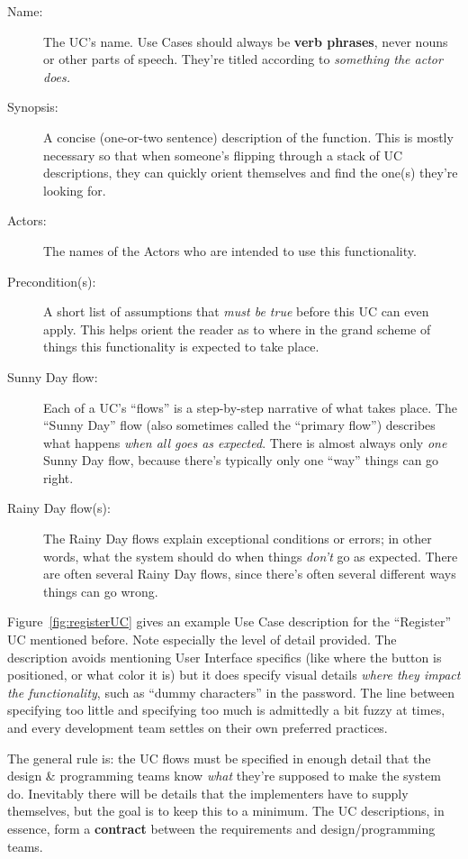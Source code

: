 \begin{description}
\item[Name:] The UC's name. Use Cases should always be \textbf{verb phrases},
never nouns or other parts of speech. They're titled according to
\textit{something the actor does.}
\item[Synopsis:] A concise (one-or-two sentence) description of the function.
This is mostly necessary so that when someone's flipping through a stack of UC
descriptions, they can quickly orient themselves and find the one(s) they're
looking for.
\item[Actors:] The names of the Actors who are intended to use this
functionality.
\item[Precondition(s):] A short list of assumptions that \textit{must be true}
before this UC can even apply. This helps orient the reader as to where in the
grand scheme of things this functionality is expected to take place.
\item[Sunny Day flow:] Each of a UC's ``flows'' is a step-by-step narrative of
what takes place. The ``Sunny Day'' flow (also sometimes called the ``primary
flow'') describes what happens \textit{when all goes as expected}. There is
almost always only \textit{one} Sunny Day flow, because there's typically only
one ``way'' things can go right.
\item[Rainy Day flow(s):] The Rainy Day flows explain exceptional conditions
or errors; in other words, what the system should do when things
\textit{don't} go as expected. There are often several Rainy Day flows, since
there's often several different ways things can go wrong.
\end{description}

Figure~\ref{fig:registerUC} gives an example Use Case description for the
``Register'' UC mentioned before. Note especially the level of detail
provided. The description avoids mentioning User Interface specifics (like
where the button is positioned, or what color it is) but it does specify
visual details \textit{where they impact the functionality}, such as ``dummy
characters'' in the password. The line between specifying too little and
specifying too much is admittedly a bit fuzzy at times, and every development
team settles on their own preferred practices.

The general rule is: the UC flows must be specified in enough detail that the
design \& programming teams know \textit{what} they're supposed to make the
system do. Inevitably there will be details that the implementers have to
supply themselves, but the goal is to keep this to a minimum. The UC
descriptions, in essence, form a \textbf{contract} between the requirements
and design/programming teams.

